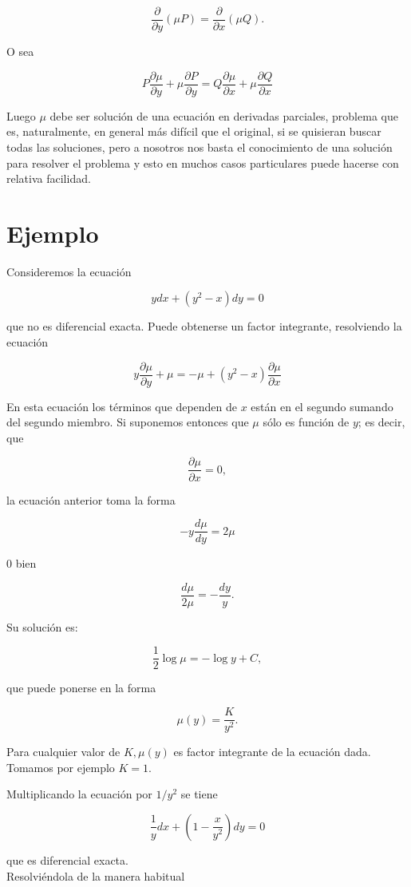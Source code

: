 \documentclass[10pt]{article}
\theoremstyle{plain}
\theoremstyle{definition}
\theoremstyle{remark}
\begin{document}
$$
\frac{\partial}{\partial y}(\mu P)=\frac{\partial}{\partial x}(\mu Q) .
$$

O sea

$$
P \frac{\partial \mu}{\partial y}+\mu \frac{\partial P}{\partial y}=Q \frac{\partial \mu}{\partial x}+\mu \frac{\partial Q}{\partial x}
$$

Luego $\mu$ debe ser solución de una ecuación en derivadas parciales, problema que es, naturalmente, en general más difícil que el original, si se quisieran buscar todas las soluciones, pero a nosotros nos basta el conocimiento de una solución para resolver el problema y esto en muchos casos particulares puede hacerse con relativa facilidad.

\section*{Ejemplo}
Consideremos la ecuación

$$
y d x+\left(y^{2}-x\right) d y=0
$$

que no es diferencial exacta. Puede obtenerse un factor integrante, resolviendo la ecuación

$$
y \frac{\partial \mu}{\partial y}+\mu=-\mu+\left(y^{2}-x\right) \frac{\partial \mu}{\partial x}
$$

En esta ecuación los términos que dependen de $x$ están en el segundo sumando del segundo miembro. Si suponemos entonces que $\mu$ sólo es función de $y$; es decir, que

$$
\frac{\partial \mu}{\partial x}=0,
$$

la ecuación anterior toma la forma

$$
-y \frac{d \mu}{d y}=2 \mu
$$

0 bien

$$
\frac{d \mu}{2 \mu}=-\frac{d y}{y} .
$$

Su solución es:

$$
\frac{1}{2} \log \mu=-\log y+C,
$$

que puede ponerse en la forma

$$
\mu(y)=\frac{K}{y^{2}} .
$$

Para cualquier valor de $K, \mu(y)$ es factor integrante de la ecuación dada. Tomamos por ejemplo $K=1$.

Multiplicando la ecuación por $1 / y^{2}$ se tiene

$$
\frac{1}{y} d x+\left(1-\frac{x}{y^{2}}\right) d y=0
$$

que es diferencial exacta.\\
Resolviéndola de la manera habitual
\end{document}
